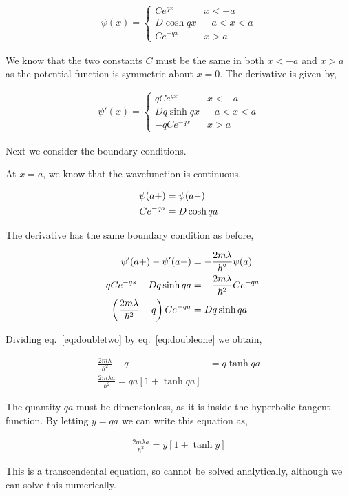 \documentclass[11pt]{amsart}
\begin{document}
\begin{align*}
  \psi(x) =
  \begin{cases}
    Ce^{qx} & x < -a \\
    D\cosh{qx} & -a < x < a \\
    Ce^{-qx} & x > a
  \end{cases}
\end{align*}

We know that the two constants $C$ must be the same in both $x < -a$ and $x > a$ as the potential function is symmetric about $x = 0$. The derivative is given by,

\begin{align*}
  \psi'(x) =
  \begin{cases}
    qCe^{qx} & x < -a \\
    Dq\sinh{qx} & -a < x < a \\
    -qCe^{-qx} & x > a
  \end{cases}
\end{align*}

Next we consider the boundary conditions.

At $x = a$, we know that the wavefunction is continuous,

\begin{align}
  \label{eq:doubleone}
  \psi(a+) &= \psi(a-) \notag\\
  Ce^{-qa} &= D\cosh{qa}
\end{align}

The derivative has the same boundary condition as before,

\begin{align}
  \label{eq:doubletwo}
  \psi'(a+) - \psi'(a-) &= -\frac{2m\lambda}{\hbar^2}\psi(a) \notag\\
  -qCe^{-qs} - Dq\sinh{qa} &= -\frac{2m\lambda}{\hbar^2}Ce^{-qa} \notag\\
  \left(\frac{2m\lambda}{\hbar^2} - q\right)Ce^{-qa} &= Dq\sinh{qa}
\end{align}

Dividing eq.~\ref{eq:doubletwo} by eq.~\ref{eq:doubleone} we obtain,

\begin{align*}
  \frac{2m\lambda}{\hbar^2} - q &= q\tanh{qa} \\
  \frac{2m\lambda a}{\hbar^2} = qa\left[1 + \tanh{qa}\right]
\end{align*}

The quantity $qa$ must be dimensionless, as it is inside the hyperbolic tangent function. By letting $y = qa$ we can write this equation as,

\begin{align*}
  \frac{2m\lambda a}{\hbar^2} = y\left[1 + \tanh{y}\right]
\end{align*}

This is a transcendental equation, so cannot be solved analytically, although we can solve this numerically.
\end{document}
